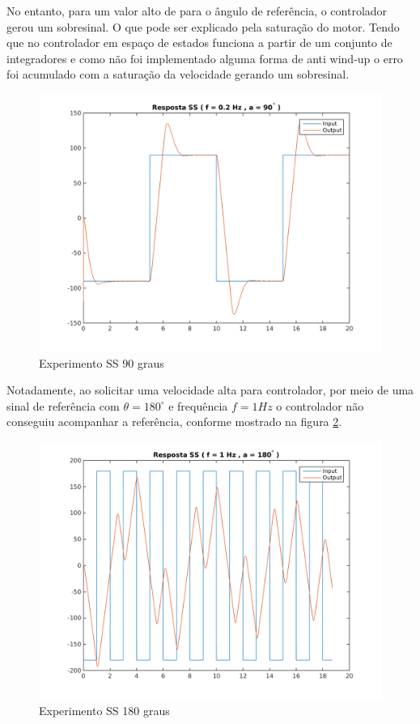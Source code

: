 \documentclass[a4paper,11pt]{article}
\begin{document}
No entanto, para um valor alto de para o ângulo de referência, o controlador gerou um sobresinal. O que pode ser explicado pela saturação do motor. Tendo que no controlador em espaço de estados funciona a partir de um conjunto de integradores e como não foi implementado alguma forma de anti wind-up o erro foi acumulado com a saturação da velocidade gerando um sobresinal.

\begin{figure}[H]
    \centering
    \includegraphics[width=0.8\linewidth]{tex/img/quanserss_s90num5.png}
    \caption{Experimento SS 90 graus}
    \label{fig:quanserss_s90num5}
\end{figure}

Notadamente, ao solicitar uma velocidade alta para controlador, por meio de uma sinal de referência com $\theta = 180^\circ$ e frequência $f = 1Hz$ o controlador não conseguiu acompanhar a referência, conforme mostrado na figura \ref{fig:quanserss_s180num1}.

\begin{figure}[H]
    \centering
    \includegraphics[width=0.8\linewidth]{tex/img/quanserss_s180num1.png}
    \caption{Experimento SS 180 graus}
    \label{fig:quanserss_s180num1}
\end{figure}
\end{document}

